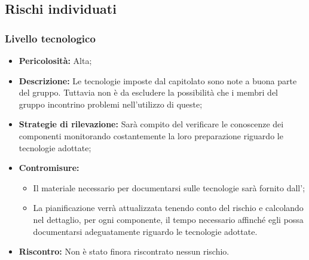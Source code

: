 \subsection{Rischi individuati}\label{ri}
\subsubsection{Livello tecnologico} \label{lt}
\label{r_tec}
\begin{itemize}
\item \textbf{Pericolosità:} Alta;
\item \textbf{Descrizione:} Le tecnologie imposte dal capitolato sono note a buona parte del gruppo. Tuttavia non è da escludere la possibilità che i membri del gruppo incontrino problemi nell'utilizzo di queste;
\item \textbf{Strategie di rilevazione:} Sarà compito del \rRP verificare le conoscenze dei componenti monitorando costantemente la loro preparazione riguardo le tecnologie adottate;
\item \textbf{Contromisure:}
\begin{itemize}
\item Il materiale necessario per documentarsi sulle tecnologie sarà fornito dall'\rAP;
\item La pianificazione verrà attualizzata tenendo conto del rischio e calcolando nel dettaglio, per ogni componente, il tempo necessario affinché egli possa documentarsi adeguatamente riguardo le tecnologie adottate.
\end{itemize}
\item \textbf{Riscontro:} Non è stato finora riscontrato nessun rischio.
\end{itemize}
\label{r_framework}
